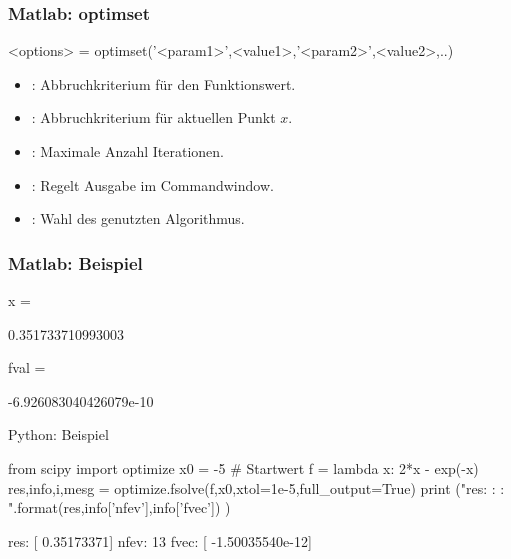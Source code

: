 \documentclass[hyperref={xetex}]{beamer}
\begin{document}
\begin{frame}[fragile]\frametitle{Matlab: optimset}
\begin{matlabin}
<options> = optimset('<param1>',<value1>,'<param2>',<value2>,..) 
\end{matlabin}
\begin{itemize}
 \item {}: Abbruchkriterium für den Funktionswert.
\item {}: Abbruchkriterium für aktuellen Punkt $x$.
\item {}: Maximale Anzahl Iterationen.
\item {}: Regelt Ausgabe im Commandwindow.
\item {}: Wahl des genutzten Algorithmus.
\end{itemize}
\end{frame}


\begin{frame}[fragile]\frametitle{Matlab: Beispiel}
\begin{matlab}
x =

   0.351733710993003

fval =

    -6.926083040426079e-10
\end{matlab}

\end{frame}

\begin{frame}[fragile]{Python: Beispiel}
  \begin{pyin}
from scipy import optimize
x0 = -5  # Startwert
f = lambda x: 2*x - exp(-x)
res,info,i,mesg = optimize.fsolve(f,x0,xtol=1e-5,full_output=True) 
print ("res: {} \nnfev: {} \nfvec: {}".format(res,info['nfev'],info['fvec']) )
  \end{pyin}
  \begin{pyout}
res: [ 0.35173371]
nfev: 13 
fvec: [ -1.50035540e-12]
  \end{pyout}
\end{frame}
\end{document}
